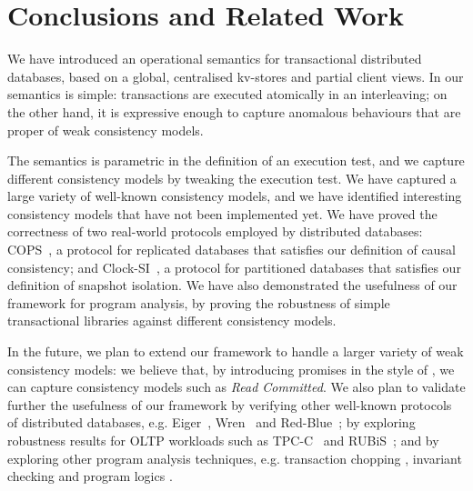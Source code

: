 \section{Conclusions and Related Work}
\label{sec:conclusions}
We have introduced  an  operational semantics for 
transactional distributed databases, based on a global, centralised 
kv-stores and partial client views. 
%
%
In our semantics is simple: transactions are executed atomically in an interleaving; on the other hand, it 
is  expressive enough to capture anomalous behaviours that are proper
of weak consistency models. 



The semantics is parametric in the definition of an execution test, and we capture different consistency 
models by tweaking the execution test. We have captured a large variety of well-known consistency 
models, 
and we have identified interesting consistency models that have not been 
implemented yet.
We have proved the correctness of two real-world protocols employed by distributed 
databases: COPS~\cite{cops}, a 
protocol for replicated databases that satisfies our definition of causal consistency;
and Clock-SI~\cite{clocksi}, a protocol for partitioned databases that satisfies our
definition of snapshot isolation. We have also demonstrated the usefulness of our framework
for program analysis, by proving the robustness of simple transactional 
libraries against different consistency models. 

In the future, we plan to extend our framework to handle a larger variety 
of weak consistency models: we believe that, by introducing promises 
in the style of \cite{promises}, we can capture  consistency models such 
as \emph{Read Committed}. We also plan to validate further the usefulness of our framework
by verifying other well-known protocols of 
distributed databases, e.g. Eiger~\cite{eiger}, Wren~\cite{wren} and
Red-Blue~\cite{redblue}; by exploring robustness results for OLTP
workloads  such as TPC-C~\cite{tpcc} and RUBiS~\cite{rubis}; 
and by exploring other program analysis techniques, e.g. 
transaction chopping \cite{chopping,psi-chopping}, invariant checking 
\cite{cise,repliss} and program logics \cite{alonetogether}. 

